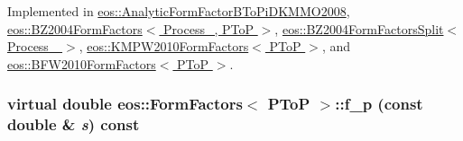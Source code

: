 Implemented in \hyperlink{classeos_1_1AnalyticFormFactorBToPiDKMMO2008_a646f3764614e79700d31571b9df620ba}{eos::AnalyticFormFactorBToPiDKMMO2008}, \hyperlink{classeos_1_1BZ2004FormFactors_3_01Process___00_01PToP_01_4_a9a3225d30afba82d87ca09b4ce5565f5}{eos::BZ2004FormFactors$<$ Process\_\-, PToP $>$}, \hyperlink{classeos_1_1BZ2004FormFactorsSplit_a4963dfd717bb53dcb1093535a6697e89}{eos::BZ2004FormFactorsSplit$<$ Process\_\- $>$}, \hyperlink{classeos_1_1KMPW2010FormFactors_3_01PToP_01_4_a7dc4ed06627cac344e437df9760f135f}{eos::KMPW2010FormFactors$<$ PToP $>$}, and \hyperlink{classeos_1_1BFW2010FormFactors_3_01PToP_01_4_ac48fd26a92111d4158f26d2189c309e9}{eos::BFW2010FormFactors$<$ PToP $>$}.\hypertarget{classeos_1_1FormFactors_3_01PToP_01_4_a987757eb4559de496005ed2730e78a10}{
\subsubsection[{f\_\-p}]{\setlength{\rightskip}{0pt plus 5cm}virtual double eos::FormFactors$<$ {\bf PToP} $>$::f\_\-p (const double \& {\em s}) const}}
\label{classeos_1_1FormFactors_3_01PToP_01_4_a987757eb4559de496005ed2730e78a10}


